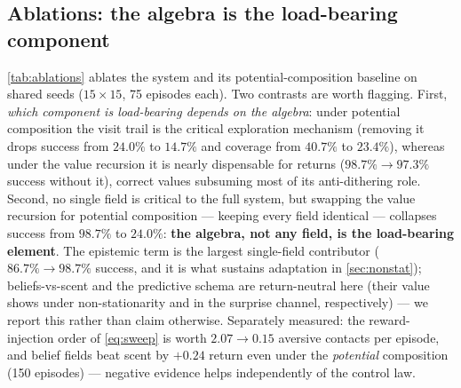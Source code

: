 \documentclass[11pt]{article}
\begin{document}
\subsection{Ablations: the algebra is the load-bearing component}
\label{sec:ablations}
\cref{tab:ablations} ablates the system and its potential-composition baseline on shared seeds ($15{\times}15$, 75 episodes each). Two contrasts are worth flagging. First, \emph{which component is load-bearing depends on the algebra}: under potential composition the visit trail is the critical exploration mechanism (removing it drops success from $24.0\%$ to $14.7\%$ and coverage from $40.7\%$ to $23.4\%$), whereas under the value recursion it is nearly dispensable for returns ($98.7\%\to97.3\%$ success without it), correct values subsuming most of its anti-dithering role. Second, no single field is critical to the full system, but swapping the value recursion for potential composition --- keeping every field identical --- collapses success from $98.7\%$ to $24.0\%$: \textbf{the algebra, not any field, is the load-bearing element}. The epistemic term is the largest single-field contributor ($86.7\%\to98.7\%$ success, and it is what sustains adaptation in \cref{sec:nonstat}); beliefs-vs-scent and the predictive schema are return-neutral here (their value shows under non-stationarity and in the surprise channel, respectively) --- we report this rather than claim otherwise. Separately measured: the reward-injection order of \cref{eq:sweep} is worth $2.07\to0.15$ aversive contacts per episode, and belief fields beat scent by $+0.24$ return even under the \emph{potential} composition (150 episodes) --- negative evidence helps independently of the control law.
\end{document}

